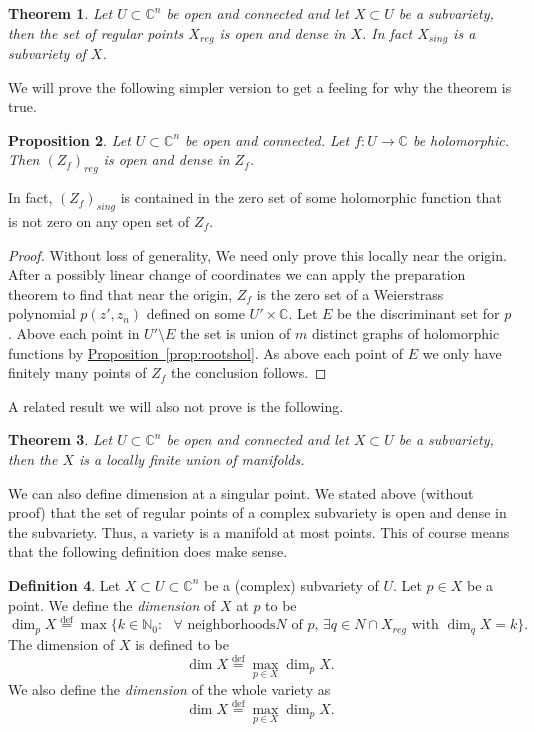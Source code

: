 \documentclass[12pt,openany]{book}
\newcommand{\C}{{\mathbb{C}}}
\newcommand{\N}{{\mathbb{N}}}
\newcommand{\myindex}[1]{#1\index{#1}}
\theoremstyle{plain}
\newtheorem{thm}{Theorem}[section]
\newtheorem{prop}[thm]{Proposition}
\theoremstyle{remark}
\theoremstyle{definition}
\newtheorem{defn}[thm]{Definition}
\theoremstyle{exercise}
\theoremstyle{example}
\newcommand{\propref}[1]{\hyperref[#1]{Proposition~\ref*{#1}}}
\begin{document}
\begin{thm}
Let $U \subset \C^n$ be open and connected and let $X \subset U$
be a subvariety, then the set of regular points $X_{\mathit{reg}}$
is open and dense in $X$.
In fact $X_{\mathit{sing}}$ is a subvariety of $X$.
\end{thm}

We will prove the following simpler version to get a feeling for why the
theorem is true.

\begin{prop}
Let $U \subset \C^n$ be open and connected.
Let $f \colon U \to \C$ be holomorphic.
Then $(Z_f)_{\mathit{reg}}$ is open and dense in $Z_f$.
\end{prop}

In fact,
$(Z_f)_{\mathit{sing}}$ is contained in the zero set of some holomorphic
function that is not zero on any open set of $Z_f$.

\begin{proof}
Without loss of generality,
We need only prove this locally near the origin.  After a possibly
linear change of coordinates we can apply the preparation theorem to find
that near the origin, $Z_f$ is the zero set of a Weierstrass polynomial
$p(z',z_n)$ defined on some $U' \times \C$.
Let $E$ be the discriminant set for $p$.  Above each
point in $U' \setminus E$ the set is union of $m$ distinct graphs
of holomorphic functions by \propref{prop:rootshol}.  As above
each point of $E$ we only have finitely many points of $Z_f$ the conclusion
follows.
\end{proof}

A related result we will also not prove is the following.

\begin{thm}
Let $U \subset \C^n$ be open and connected and let $X \subset U$
be a subvariety, then the $X$ is a locally finite union of manifolds.
\end{thm}

We can also define dimension at a singular point.
We stated above (without proof) that the set of regular points of a complex
subvariety is open and dense in the subvariety.  Thus, a
variety is a manifold at most points.  This of course means that the 
following definition does make sense.

\begin{defn}
Let $X \subset U \subset \C^n$ be a (complex) subvariety of $U$.  Let $p \in
X$ be a point.  We define the \emph{\myindex{dimension}} of $X$ at $p$
to be
\begin{equation}
\dim_p X \overset{\text{def}}{=}
\max \{ k \in \N_0 : \text{ $\forall$ neighborhoods
$N$ of $p$, $\exists q \in N \cap X_{\mathit{reg}}$ with $\dim_q X = k$} \} .
\end{equation}
The dimension of $X$ is defined to be
\begin{equation}
\dim X \overset{\text{def}}{=}
\max_{p \in X} \dim_p X .
\end{equation}
We also define the \emph{dimension} of the whole variety as
\begin{equation}
\dim X \overset{\text{def}}{=}
\max_{p \in X} \dim_p X.
\end{equation}
\end{defn}
\end{document}
